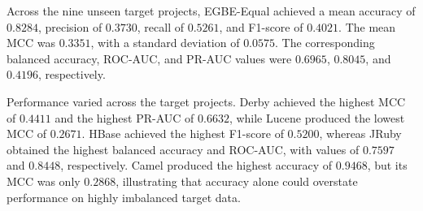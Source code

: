 \documentclass[conference]{IEEEtran}
\begin{document}
\begin{table}[H]
\caption{Strict LOPO Cross-Project Performance}
\label{tab:cpdp-project-results}
\centering
\setlength{\tabcolsep}{2.7pt}
\end{table}

Across the nine unseen target projects, EGBE-Equal achieved a mean
accuracy of \(0.8284\), precision of \(0.3730\), recall of \(0.5261\),
and F1-score of \(0.4021\). The mean MCC was \(0.3351\), with a
standard deviation of \(0.0575\). The corresponding balanced accuracy,
ROC-AUC, and PR-AUC values were \(0.6965\), \(0.8045\), and \(0.4196\),
respectively.

Performance varied across the target projects. Derby achieved the
highest MCC of \(0.4411\) and the highest PR-AUC of \(0.6632\), while
Lucene produced the lowest MCC of \(0.2671\). HBase achieved the
highest F1-score of \(0.5200\), whereas JRuby obtained the highest
balanced accuracy and ROC-AUC, with values of \(0.7597\) and \(0.8448\),
respectively. Camel produced the highest accuracy of \(0.9468\), but
its MCC was only \(0.2868\), illustrating that accuracy alone could
overstate performance on highly imbalanced target data.
\end{document}
